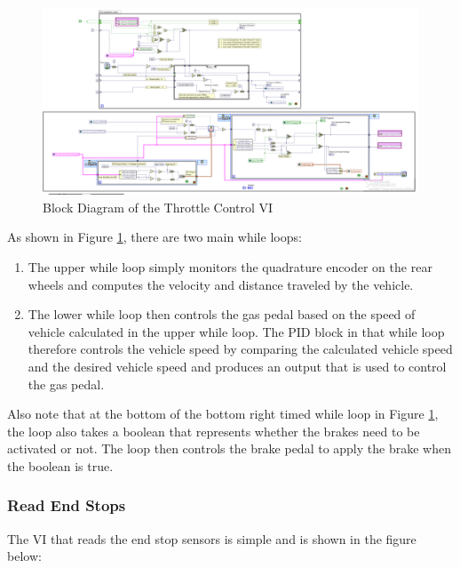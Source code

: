 \begin{figure}[h!]
\centering
\includegraphics[scale=0.75]{Photos/throttlecontrol.png}
\caption{Block Diagram of the Throttle Control VI}
\label{fig:throttlecontrol}
\end{figure}

\noindent As shown in Figure \ref{fig:throttlecontrol}, there are two main while loops:

\begin{enumerate}
\item The upper while loop simply monitors the quadrature encoder on the rear wheels and computes the velocity and distance traveled by the vehicle. 
\item The lower while loop then controls the gas pedal based on the speed of vehicle calculated in the upper while loop. The PID block in that while loop therefore controls the vehicle speed by comparing the calculated vehicle speed and the desired vehicle speed and produces an output that is used to control the gas pedal. 
\end{enumerate}

\noindent Also note that at the bottom of the bottom right timed while loop in Figure \ref{fig:throttlecontrol}, the loop also takes a boolean that represents whether the brakes need to be activated or not. The loop then controls the brake pedal to apply the brake when the boolean is true.

\subsubsection{Read End Stops}

The VI that reads the end stop sensors is simple and is shown in the figure below:

